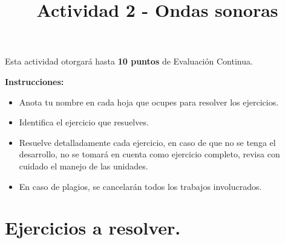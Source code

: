 \documentclass[14pt]{extarticle}
\title{\vspace*{-2cm} Actividad 2 - Ondas sonoras\vspace{-5ex}}
\date{}
\begin{document}
\maketitle

Esta actividad otorgará hasta \textbf{10 puntos} de Evaluación Continua.
\vspace*{0.5cm}

\textbf{Instrucciones: }
\begin{itemize}
\item Anota tu nombre en cada hoja que ocupes para resolver los ejercicios.
\item Identifica el ejercicio que resuelves.
\item Resuelve detalladamente cada ejercicio, en caso de que no se tenga el desarrollo, no se tomará en cuenta como ejercicio completo, revisa con cuidado el manejo de las unidades.
\item En caso de plagios, se cancelarán todos los trabajos involucrados.
\end{itemize}


\section*{Ejercicios a resolver.}
\end{document}
